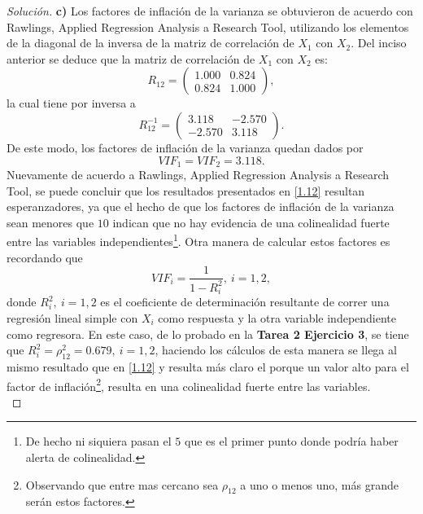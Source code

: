 \documentclass[10.5pt,notitlepage]{article}
\newenvironment{solucion}
  {\begin{proof}[Solución]}
  {\end{proof}}
\theoremstyle{plain}
\begin{document}
\begin{solucion}
\noindent \textbf{c)} Los factores de inflación de la varianza se obtuvieron de acuerdo con Rawlings, Applied Regression Analysis a Research Tool, utilizando los elementos de la diagonal de la inversa de la matriz de correlación de \(X_1\) con \(X_2\). Del inciso anterior se deduce que la matriz de correlación de \(X_1\) con \(X_2\) es:
\begin{equation*}
 R_{12} = \begin{pmatrix}
 1.000& 0.824\\ 
 0.824& 1.000
 \end{pmatrix},
\end{equation*}
la cual tiene por inversa a 
\begin{equation*}
 R_{12}^{-1} = \begin{pmatrix}
  3.118& -2.570\\ 
 -2.570& 3.118
 \end{pmatrix}. 
\end{equation*}
De este modo, los factores de inflación de la varianza quedan dados por
\begin{equation}\label{1.12}
    VIF_{1} = VIF_{2} = 3.118.
\end{equation}
Nuevamente de acuerdo a Rawlings, Applied Regression Analysis a Research Tool, se puede concluir que los resultados presentados en \eqref{1.12} resultan esperanzadores, ya que el hecho de que los factores de inflación de la varianza sean menores que \(10\) indican que no hay evidencia de una colinealidad fuerte entre las variables independientes\footnote{De hecho ni siquiera pasan el \(5\) que es el primer punto donde podría haber alerta de colinealidad.}. Otra manera de calcular estos factores es recordando que 
\[
VIF_{i} = \frac{1}{1 - R_{i}^2}, \ i= 1,2,
\]
donde \(R_{i}^2,\ i=1,2\) es el coeficiente de determinación resultante de correr una regresión lineal simple con \(X_i\) como respuesta y la otra variable independiente como regresora. En este caso, de lo probado en la \textbf{Tarea 2 Ejercicio 3}, se tiene que \(R_{i}^2 = \rho_{12}^2 = 0.679, \ i = 1,2\), haciendo los cálculos de esta manera se llega al mismo resultado que en \eqref{1.12} y resulta más claro el porque un valor alto para el factor de inflación\footnote{Observando que entre mas cercano sea \(\rho_{12}\) a uno o menos uno, más grande serán estos factores.}, resulta en una colinealidad fuerte entre las variables.\\ 


\end{solucion}
\end{document}
